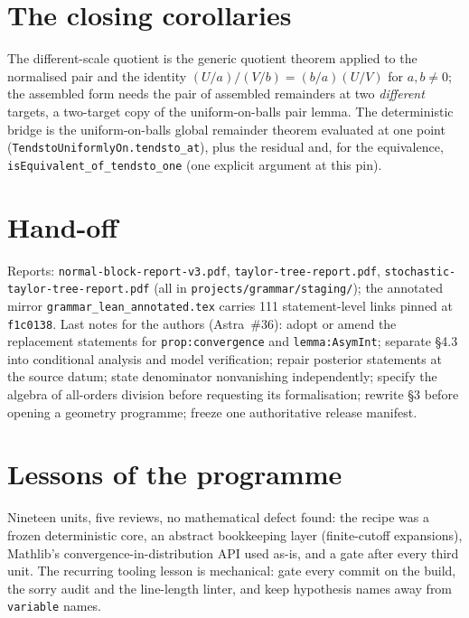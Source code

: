 \documentclass[11pt]{article}
\begin{document}
\section{The closing corollaries}
The different-scale quotient is the generic quotient theorem applied to the normalised pair and the
identity $(U/a)/(V/b)=(b/a)(U/V)$ for $a,b\ne0$; the assembled form needs the pair of assembled
remainders at two \emph{different} targets, a two-target copy of the uniform-on-balls pair lemma. The
deterministic bridge is the uniform-on-balls global remainder theorem evaluated at one point
(\texttt{TendstoUniformlyOn.tendsto\_at}), plus the residual and, for the equivalence,
\texttt{isEquivalent\_of\_tendsto\_one} (one explicit argument at this pin).

\section{Hand-off}
Reports: \texttt{normal-block-report-v3.pdf}, \texttt{taylor-tree-report.pdf},
\texttt{stochastic-taylor-tree-report.pdf} (all in \texttt{projects/grammar/staging/}); the annotated
mirror \texttt{grammar\_lean\_annotated.tex} carries 111 statement-level links pinned at
\texttt{f1c0138}. Last notes for the authors (Astra~\#36): adopt or amend the replacement statements
for \texttt{prop:convergence} and \texttt{lemma:AsymInt}; separate \S4.3 into conditional analysis
and model verification; repair posterior statements at the source datum; state denominator
nonvanishing independently; specify the algebra of all-orders division before requesting its
formalisation; rewrite \S3 before opening a geometry programme; freeze one authoritative release
manifest.

\section{Lessons of the programme}
Nineteen units, five reviews, no mathematical defect found: the recipe was a frozen deterministic
core, an abstract bookkeeping layer (finite-cutoff expansions), Mathlib's convergence-in-distribution
API used as-is, and a gate after every third unit. The recurring tooling lesson is mechanical: gate
every commit on the build, the sorry audit and the line-length linter, and keep hypothesis names away
from \texttt{variable} names.
\end{document}

